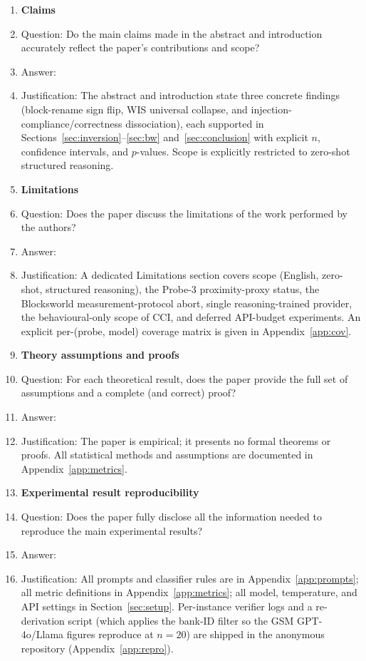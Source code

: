 \begin{enumerate}

\item {\bf Claims}
    \item[] Question: Do the main claims made in the abstract and introduction
    accurately reflect the paper's contributions and scope?
    \item[] Answer: \answerYes{}
    \item[] Justification: The abstract and introduction state three concrete
    findings (block-rename sign flip, WIS universal collapse, and
    injection-compliance/correctness dissociation), each supported in
    Sections~\ref{sec:inversion}--\ref{sec:bw} and~\ref{sec:conclusion} with
    explicit $n$, confidence intervals, and $p$-values. Scope is explicitly
    restricted to zero-shot structured reasoning.

\item {\bf Limitations}
    \item[] Question: Does the paper discuss the limitations of the work
    performed by the authors?
    \item[] Answer: \answerYes{}
    \item[] Justification: A dedicated Limitations section covers scope
    (English, zero-shot, structured reasoning), the Probe-3 proximity-proxy
    status, the Blocksworld measurement-protocol abort, single
    reasoning-trained provider, the behavioural-only scope of CCI, and deferred
    API-budget experiments. An explicit per-(probe, model) coverage matrix is
    given in Appendix~\ref{app:cov}.

\item {\bf Theory assumptions and proofs}
    \item[] Question: For each theoretical result, does the paper provide the
    full set of assumptions and a complete (and correct) proof?
    \item[] Answer: \answerNA{}
    \item[] Justification: The paper is empirical; it presents no formal
    theorems or proofs. All statistical methods and assumptions are documented
    in Appendix~\ref{app:metrics}.

\item {\bf Experimental result reproducibility}
    \item[] Question: Does the paper fully disclose all the information needed
    to reproduce the main experimental results?
    \item[] Answer: \answerYes{}
    \item[] Justification: All prompts and classifier rules are in
    Appendix~\ref{app:prompts}; all metric definitions in
    Appendix~\ref{app:metrics}; all model, temperature, and API settings in
    Section~\ref{sec:setup}. Per-instance verifier logs and a re-derivation
    script (which applies the bank-ID filter so the GSM GPT-4o/Llama figures
    reproduce at $n{=}20$) are shipped in the anonymous repository
    (Appendix~\ref{app:repro}).


\end{enumerate}
